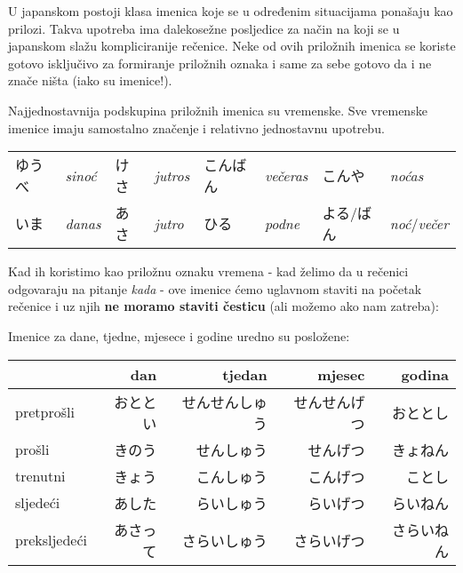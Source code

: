 
\author{Tomislav Mamić}

	
	
	U japanskom postoji klasa imenica koje se u određenim situacijama ponašaju kao prilozi. Takva upotreba ima dalekosežne posljedice za način na koji se u japanskom slažu kompliciranije rečenice. Neke od ovih priložnih imenica se koriste gotovo isključivo za formiranje priložnih oznaka i same za sebe gotovo da i ne znače ništa (iako su imenice!).
	
	Najjednostavnija podskupina priložnih imenica su vremenske. Sve vremenske imenice imaju samostalno značenje i relativno jednostavnu upotrebu.
	
	
	\begin{tabular}{l l l l l l l l}
		ゆうべ & \textit{sinoć} & けさ & \textit{jutros} & こんばん & \textit{večeras} & こんや & \textit{noćas}\\
 		いま & \textit{danas} & あさ & \textit{jutro} & ひる & \textit{podne} & よる/ばん & \textit{noć}/\textit{večer}\\
	\end{tabular}

	\vspace{10pt}
	Kad ih koristimo kao priložnu oznaku vremena - kad želimo da u rečenici odgovaraju na pitanje \textit{kada} - ove imenice ćemo uglavnom staviti na početak rečenice i uz njih \textbf{ne moramo staviti česticu} (ali možemo ako nam zatreba):
	
	\begin{reibun}
	\end{reibun}

	Imenice za dane, tjedne, mjesece i godine uredno su posložene:
	
	\begin{table}[h]
		\centering
		\begin{tabular}{l r r r r}\toprule[2pt]
			& dan & tjedan & mjesec & godina \\
			\midrule
			pretprošli 		& おととい & せんせんしゅう & せんせんげつ & おととし \\
			prošli 			& きのう & せんしゅう & せんげつ & きょねん \\
			trenutni 		& きょう & こんしゅう & こんげつ & ことし \\
			sljedeći 		& あした & らいしゅう & らいげつ & らいねん \\
			preksljedeći 	& あさって & さらいしゅう & さらいげつ & さらいねん \\
			\bottomrule[2pt]
		\end{tabular}
	\end{table}
	

